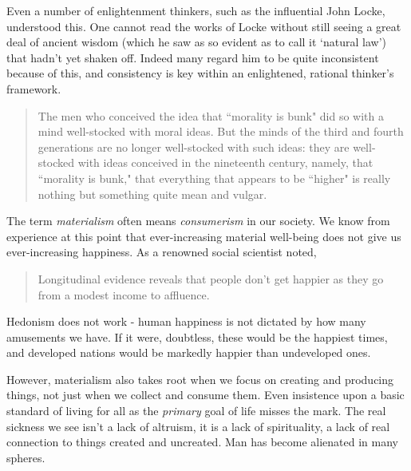 \documentclass[letterpaper]{article}
\begin{document}
Even a number of enlightenment thinkers, such as the influential John Locke, understood this. One cannot read the works of Locke without still seeing a great deal of ancient wisdom (which he saw as so evident as to call it `natural law') that hadn't yet shaken off. Indeed many regard him to be quite inconsistent because of this, and consistency is key within an enlightened, rational thinker's framework.

\begin{quote}
  The men who conceived the idea that ``morality is bunk" did so with a mind well-stocked with moral ideas. But the minds of the third and fourth generations are no longer well-stocked with such ideas: they are well-stocked with ideas conceived in the nineteenth century, namely, that ``morality is bunk," that everything that appears to be ``higher" is really nothing but something quite mean and vulgar.
\end{quote}

The term \textit{materialism} often means \textit{consumerism} in our society. We know from experience at this point that ever-increasing material well-being does not give us ever-increasing happiness. As a renowned social scientist noted,

\begin{quote}
  Longitudinal evidence reveals that people don't get happier as they go from a modest income to affluence.
\end{quote}

Hedonism does not work - human happiness is not dictated by how many amusements we have. If it were, doubtless, these would be the happiest times, and developed nations would be markedly happier than undeveloped ones.

However, materialism also takes root when we focus on creating and producing things, not just when we collect and consume them. Even insistence upon a basic standard of living for all as the \textit{primary} goal of life misses the mark. The real sickness we see isn't a lack of altruism, it is a lack of spirituality, a lack of real connection to things created and uncreated. Man has become alienated in many spheres.
\end{document}

